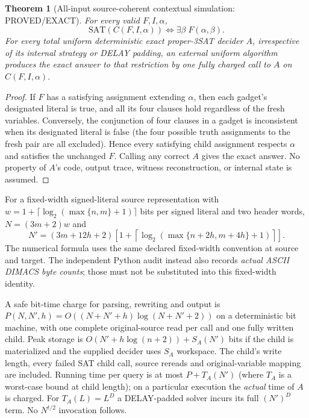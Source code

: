 \documentclass[11pt]{article}
\newtheorem{theorem}{Theorem}
\begin{document}
\begin{theorem}[All-input source-coherent contextual simulation: PROVED/EXACT]
For every valid $F,I,\alpha$,
\[
\mathrm{SAT}(C(F,I,\alpha))\iff
\exists\beta\;F(\alpha,\beta).
\]
For \emph{every} total uniform deterministic exact proper-3SAT decider $A$, irrespective of its internal strategy or DELAY padding, an external uniform algorithm produces the exact answer to that restriction by one fully charged call to $A$ on $C(F,I,\alpha)$.
\end{theorem}
\begin{proof}
If $F$ has a satisfying assignment extending $\alpha$, then each gadget's designated literal is true, and all its four clauses hold regardless of the fresh variables. Conversely, the conjunction of four clauses in a gadget is inconsistent when its designated literal is false (the four possible truth assignments to the fresh pair are all excluded). Hence every satisfying child assignment respects $\alpha$ and satisfies the unchanged $F$. Calling any correct $A$ gives the exact answer. No property of $A$'s code, output trace, witness reconstruction, or internal state is assumed.
\end{proof}

For a fixed-width signed-literal source representation with
$w=1+\lceil\log_2(\max\{n,m\}+1)\rceil$ bits per signed literal and two header words, $N=(3m+2)w$ and
\[
N'=(3m+12h+2)\left[1+\left\lceil
\log_2(\max\{n+2h,m+4h\}+1)\right\rceil\right].
\]
The numerical formula uses the same declared fixed-width convention at source and target. The independent Python audit instead also records \emph{actual ASCII DIMACS byte counts}; those must not be substituted into this fixed-width identity.

A safe bit-time charge for parsing, rewriting and output is
$P(N,N',h)=O((N+N'+h)\log(N+N'+2))$ on a deterministic bit machine, with one complete original-source read per call and one fully written child. Peak storage is $O(N'+h\log(n+2))+S_A(N')$ bits if the child is materialized and the supplied decider uses $S_A$ workspace. The child's write length, every failed SAT child call, source rereads and original-variable mapping are included. Running time per query is at most $P+T_A(N')$ (where $T_A$ is a worst-case bound at child length); on a particular execution the \emph{actual} time of $A$ is charged. For $T_A(L)=L^D$ a DELAY-padded solver incurs its full $(N')^D$ term. No $N^{t/2}$ invocation follows.
\end{document}
